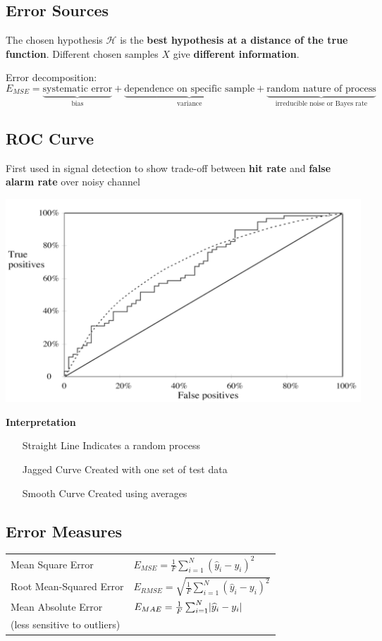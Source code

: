 \documentclass[11pt]{article}
\theoremstyle{definition}
\DeclarePairedDelimiter\abs{\lvert}{\rvert}
\begin{document}
\subsection{Error Sources}

The chosen hypothesis $\mathcal{H}$ is the \textbf{best hypothesis at a distance of the true function}. Different chosen samples $X$ give \textbf{different information}.

\noindent
Error decomposition:
\begin{equation*}
	E_{MSE} = \underbrace{\text{systematic error}}_{\text{bias}} + \underbrace{\text{dependence on specific sample}}_{\text{variance}}  + \underbrace{\text{random nature of process}}_{\text{irreducible noise or Bayes rate}}
\end{equation*}

\subsection{ROC Curve}
First used in signal detection to show trade-off between \textbf{hit rate} and \textbf{false alarm rate} over noisy channel

\begin{center}
	\includegraphics[width=0.7\linewidth]{img/ROC_curve}
\end{center}

\noindent
\textbf{Interpretation}
\begin{itemize}[leftmargin=*, labelindent=3cm, labelsep=1cm]
	\item[Straight Line] Indicates a random process
	\item[Jagged Curve] Created with one set of test data
	\item[Smooth Curve] Created using averages
\end{itemize}

\subsection{Error Measures}
\begin{tabularx}{\linewidth}{lX}
	Mean Square Error & $ E_{MSE} = \frac{1}{F}\sum_{i=1}^{N} (\widehat{y}_i - y_i)^2 $\\
	Root Mean-Squared Error & $E_{RMSE} = \sqrt{\frac{1}{F}\sum_{i=1}^{N} (\widehat{y}_i - y_i)^2 } $\\
	Mean Absolute Error & $ E_{MAE} = \frac{1}{F}\sum_{i=1}^{N} \abs{\widehat{y}_i - y_i}$\\
	(less sensitive to outliers)
\end{tabularx}
\end{document}
